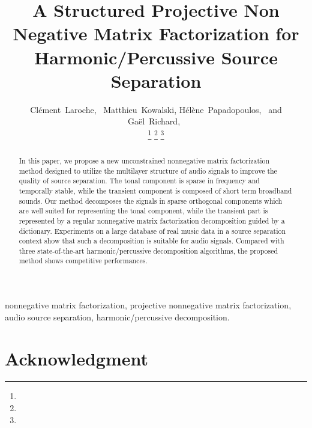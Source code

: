 \documentclass[journal]{IEEEtran}
\begin{document}
\title{A Structured Projective Non Negative Matrix Factorization for Harmonic/Percussive Source Separation}

\author{Cl\'{e}ment~Laroche,~
        Matthieu~Kowalski,
        H\'{e}l\`{e}ne~Papadopoulos,~
        and Ga\"{el}~Richard,~%
        
\thanks{}%
\thanks{}%
\thanks{}}



\maketitle


\begin{abstract}
In this paper, we propose a new unconstrained nonnegative matrix factorization method designed to utilize the multilayer structure of audio signals to improve the quality of source separation. The tonal component is sparse in frequency and temporally stable, while the transient component is composed of short term broadband sounds. Our method decomposes the signals in sparse orthogonal components which are well suited for representing the tonal component, while the transient part is represented by a regular nonnegative matrix factorization decomposition guided by a dictionary. Experiments on a large database of real music data in a source separation context show that such a decomposition is suitable for audio signals. Compared with three state-of-the-art harmonic/percussive decomposition algorithms, the proposed method shows competitive performances.
\end{abstract}


\begin{IEEEkeywords}
nonnegative matrix factorization, projective nonnegative matrix factorization, audio source separation, harmonic/percussive decomposition.
\end{IEEEkeywords}

















\section*{Acknowledgment}
\end{document}
